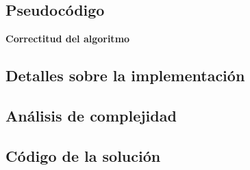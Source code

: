 
\subsection{Pseudocódigo}

\textbf{Correctitud del algoritmo}\\

\subsection{Detalles sobre la implementación}

\subsection{Análisis de complejidad}

\newpage
\subsection{Código de la solución}

